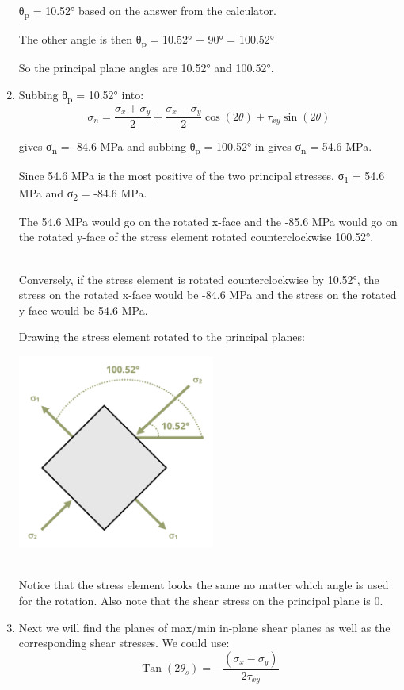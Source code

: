 \documentclass[
  letterpaper,
  DIV=11,
  numbers=noendperiod]{scrreprt}
\theoremstyle{definition}
\theoremstyle{remark}
\begin{document}
\begin{tcolorbox}
\begin{tcolorbox}
\begin{enumerate}
  θ\textsubscript{p} = 10.52° based on the answer from the calculator.

  The other angle is then θ\textsubscript{p} = 10.52° + 90° = 100.52°

  So the principal plane angles are 10.52° and 100.52°.
\item
  Subbing θ\textsubscript{p} = 10.52° into:\\
  \[
  \sigma_n=\frac{\sigma_x+\sigma_y}{2}+\frac{\sigma_x-\sigma_y}{2} \cos (2 \theta)+\tau_{x y} \sin (2 \theta)
  \]

  gives σ\textsubscript{n} = -84.6 MPa and subbing θ\textsubscript{p} =
  100.52° in gives σ\textsubscript{n} = 54.6 MPa.

  Since 54.6 MPa is the most positive of the two principal stresses,
  σ\textsubscript{1} = 54.6 MPa and σ\textsubscript{2} = -84.6 MPa.

  The 54.6 MPa would go on the rotated x-face and the -85.6 MPa would go
  on the rotated y-face of the stress element rotated counterclockwise
  100.52°.\\
  \strut \\
  Conversely, if the stress element is rotated counterclockwise by
  10.52°, the stress on the rotated x-face would be -84.6 MPa and the
  stress on the rotated y-face would be 54.6 MPa.

  Drawing the stress element rotated to the principal planes:

  \includegraphics[width=2.55208in,height=\textheight]{images/CH12 figures/example 12.3 part 2.png}\\
  \strut \\
  Notice that the stress element looks the same no matter which angle is
  used for the rotation. Also note that the shear stress on the
  principal plane is 0.
\item
  Next we will find the planes of max/min in-plane shear planes as well
  as the corresponding shear stresses. We could use:\\
  \[
  \operatorname{Tan}\left(2 \theta_s\right)=-\frac{\left(\sigma_x-\sigma_y\right)}{2 \tau_{x y}}
  \]


\end{enumerate}
\end{tcolorbox}
\end{tcolorbox}
\end{document}
